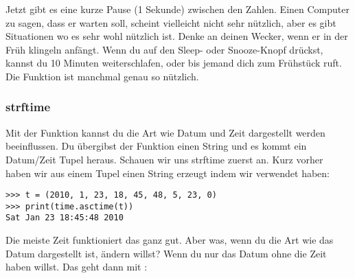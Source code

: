 \noindent
Jetzt gibt es eine kurze Pause (1 Sekunde) zwischen den Zahlen. Einen Computer zu sagen, dass er warten soll, scheint vielleicht nicht sehr nützlich, aber es gibt Situationen wo es sehr wohl nützlich ist.  Denke an deinen Wecker, wenn er in der Früh klingeln anfängt. Wenn du auf den Sleep- oder Snooze-Knopf drückst, kannst du 10 Minuten weiterschlafen, oder bis jemand dich zum Frühstück ruft. Die  Funktion ist manchmal genau so nützlich.

\subsubsection*{strftime}
Mit der  Funktion kannst du die Art wie Datum und Zeit dargestellt werden beeinflussen. Du übergibst der  Funktion einen String und es kommt ein Datum/Zeit Tupel heraus. Schauen wir uns strftime zuerst an. Kurz vorher haben wir aus einem Tupel einen String erzeugt indem wir  verwendet haben:

\begin{Verbatim}[frame=single]
>>> t = (2010, 1, 23, 18, 45, 48, 5, 23, 0)
>>> print(time.asctime(t))
Sat Jan 23 18:45:48 2010
\end{Verbatim}

\noindent
Die meiste Zeit funktioniert das ganz gut. Aber was, wenn du die Art wie das Datum dargestellt ist, ändern willst? Wenn du nur das Datum ohne die Zeit haben willst. Das geht dann mit :

